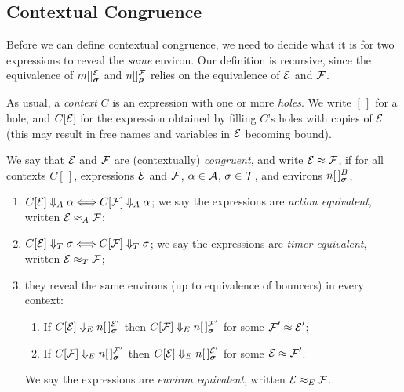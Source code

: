 \documentclass[orivec,envcountsame]{llncs}
\begin{document}
\subsection{Contextual Congruence}
\label{sec:contextual-congruence}

Before we can define contextual congruence, we need to decide what it is for 
two expressions to reveal the \emph{same} environ. Our definition is
recursive, since the equivalence of $\locv{m}{}{\expr}{\vec{\sigma}}$ and
$\locv{n}{}{\exprb}{\vec{\rho}}$ relies on the equivalence of $\text{$\mathcal{E}$}$ and
$\text{$\mathcal{F}$}$.

As usual, a \emph{context} $C$ is an expression with one or more
\emph{holes}. We write $[\,]$ for a hole, and $C[\text{$\mathcal{E}$}]$ for the expression
obtained by filling $C$'s holes with copies of $\text{$\mathcal{E}$}$ (this may result
in free names and variables in $\text{$\mathcal{E}$}$ becoming bound).

\begin{definition}

We say that $\text{$\mathcal{E}$}$ and $\text{$\mathcal{F}$}$ are (contextually) \emph{congruent}, and write
$\text{$\mathcal{E}$} \approx \text{$\mathcal{F}$}$, if for all contexts $C[\,]$, expressions $\text{$\mathcal{E}$}$ and
$\text{$\mathcal{F}$}$, $\alpha \in \text{$\mathcal{A}$}$, $\sigma \in \text{$\mathcal{T}$}$, and environs
$\locv{n}{\,}{B}{\vec{\sigma}}$,

\begin{enumerate}
\item
     $C[\text{$\mathcal{E}$}] \mathrel{\Downarrow_{A}} \alpha \Longleftrightarrow C[\text{$\mathcal{F}$}] \mathrel{\Downarrow_{A}} \alpha$;
     we say the expressions are \emph{action equivalent}, written $\text{$\mathcal{E}$} \mathrel{\approx_{A}}
     \text{$\mathcal{F}$}$; 
\item
     $C[\text{$\mathcal{E}$}] \mathrel{\Downarrow_{T}} \sigma \Longleftrightarrow C[\text{$\mathcal{F}$}] \mathrel{\Downarrow_{T}} \sigma$; we
     say the expressions are \emph{timer equivalent}, written   $\text{$\mathcal{E}$} \mathrel{\approx_{T}}
     \text{$\mathcal{F}$}$; 
\item
     they reveal the same environs (up to equivalence of bouncers) in every 
     context:
     \begin{enumerate}
     \item
        If $C[\expr] \RevealsE \locv{n}{\,}{\expr'}{\vec{\sigma}}$ then
        $C[\exprb] \RevealsE \locv{n}{\,}{\exprb'}{\vec{\sigma}}$
        for some $\text{$\mathcal{F}$}' \approx \text{$\mathcal{E}$}'$;
     \item
        If $C[\exprb] \RevealsE \locv{n}{\,}{\exprb'}{\vec{\sigma}}$ then
        $C[\expr] \RevealsE \locv{n}{\,}{\expr'}{\vec{\sigma}}$
        for some $\text{$\mathcal{E}$} \approx \text{$\mathcal{F}$}'$.
     \end{enumerate}
     We say the expressions are \emph{environ equivalent}, written $\text{$\mathcal{E}$} \mathrel{\approx_{E}} 
     \text{$\mathcal{F}$}$.
\end{enumerate}

\end{definition}
\end{document}
